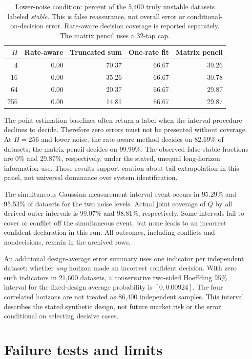 \documentclass[11pt]{article}
\theoremstyle{remark}\newtheorem{remark}[theorem]{Remark}
\begin{document}
\begin{table}[ht]
\centering\small
\begin{tabular}{rrrrr}
\toprule $H$&Rate-aware&Truncated sum&One-rate fit&Matrix pencil\\\midrule
4 & 0.00 & 70.37 & 66.67 & 39.26 \\
16 & 0.00 & 35.26 & 66.67 & 30.78 \\
64 & 0.00 & 20.37 & 66.67 & 29.87 \\
256 & 0.00 & 14.81 & 66.67 & 29.87 \\
\bottomrule
\end{tabular}
\caption{Lower-noise condition: percent of the 5,400 truly unstable datasets labeled \emph{stable}. This is false reassurance, not overall error or conditional-on-decision error. Rate-aware decision coverage is reported separately. The matrix pencil uses a 32-tap cap.}\label{tab:false}
\end{table}
The point-estimation baselines often return a label when the interval procedure declines to decide. Therefore zero errors must not be presented without coverage. At $H=256$ and lower noise, the rate-aware method decides on 82.69\% of datasets; the matrix pencil decides on 99.99\%. The observed false-stable fractions are 0\% and 29.87\%, respectively, under the stated, unequal long-horizon information use. Those results support caution about tail extrapolation in this panel, not universal dominance over system identification.

The simultaneous Gaussian measurement-interval event occurs in 95.29\% and 95.53\% of datasets for the two noise levels. Actual joint coverage of $Q$ by all derived outer intervals is 99.07\% and 98.81\%, respectively. Some intervals fail to cover or conflict off the simultaneous event, but none leads to an incorrect confident declaration in this run. All outcomes, including conflicts and nondecisions, remain in the archived rows.

An additional design-average error summary uses one indicator per independent dataset: whether \emph{any} horizon made an incorrect confident decision. With zero such indicators in 21,600 datasets, a conservative two-sided Hoeffding 95\% interval for the fixed-design average probability is $[0,0.00924]$. The four correlated horizons are not treated as 86,400 independent samples. This interval describes the stated synthetic design, not future market risk or the error conditional on selecting decisive cases.

\section{Failure tests and limits}\label{sec:failure}
\end{document}
